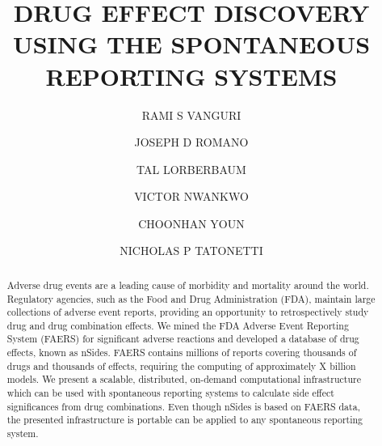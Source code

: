 \documentclass{ws-procs11x85}
\begin{document}
\title{DRUG EFFECT DISCOVERY USING THE SPONTANEOUS REPORTING SYSTEMS}

\author{RAMI S VANGURI}

\address{Department of Biomedical Informatics, Columbia University,\\
New York, NY 10032 USA\\
E-mail: r.vanguri@columbia.edu}

\author{JOSEPH D ROMANO}

\address{Department of Biomedical Informatics, Columbia University,\\
New York, NY 10032 USA\\
E-mail: jdr2160@columbia.edu}

\author{TAL LORBERBAUM}

\address{Department of Biomedical Informatics, Columbia University,\\
New York, NY 10032 USA\\
E-mail: tal.lorberbaum@columbia.edu}

\author{VICTOR NWANKWO}

\address{Department of Biomedical Informatics, Columbia University,\\
New York, NY 10032 USA\\
E-mail: vtn2106@columbia.edu}

\author{CHOONHAN YOUN}

\address{San Diego Supercomputer Center, University of California, San Diego,\\
La Jolla, CA 92093 USA\\
E-mail: cyoun@sdsc.edu}

\author{NICHOLAS P TATONETTI}

\address{Department of Biomedical Informatics, Columbia University,\\
New York, NY 10032 USA\\
E-mail: nick.tatonetti@columbia.edu}

\begin{abstract}
Adverse drug events are a leading cause of morbidity and mortality
around the world. Regulatory agencies, such as the Food and Drug
Administration (FDA), maintain large collections of adverse event
reports, providing an opportunity to retrospectively study drug and
drug combination effects.  We mined the FDA Adverse Event Reporting
System (FAERS) for significant adverse reactions and developed a
database of drug effects, known as nSides. FAERS contains millions of
reports covering thousands of drugs and thousands of effects,
requiring the computing of approximately X billion models. We present
a scalable, distributed, on-demand computational infrastructure which
can be used with spontaneous reporting systems to calculate side
effect significances from drug combinations. Even though nSides is
based on FAERS data, the presented infrastructure is portable can be
applied to any spontaneous reporting system.
\end{abstract}
\end{document}

